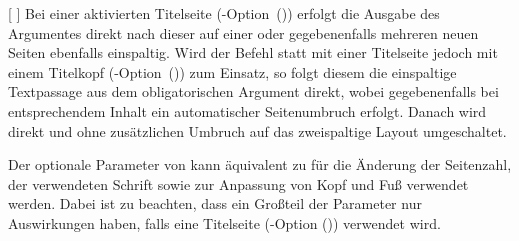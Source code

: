 \begin{Declaration*}{}
\begin{Declaration*}{}
\begin{Declaration*}{}
\begin{Declaration}{%
  [%
  ]%
}
Bei einer aktivierten Titelseite 
(\KOMAScript-Option~()) erfolgt die 
Ausgabe des Argumentes  direkt nach dieser auf einer 
oder gegebenenfalls mehreren neuen Seiten ebenfalls einspaltig. Wird der Befehl 
 statt mit einer Titelseite jedoch mit einem 
Titelkopf (\KOMAScript-Option~()) 
zum Einsatz, so folgt diesem die einspaltige Textpassage aus dem 
obligatorischen Argument direkt, wobei gegebenenfalls bei entsprechendem Inhalt 
ein automatischer Seitenumbruch erfolgt. Danach wird direkt und ohne 
zusätzlichen Umbruch auf das zweispaltige Layout umgeschaltet.

Der optionale Parameter von  kann äquivalent zu 
 für die Änderung der Seitenzahl, der verwendeten Schrift 
sowie zur Anpassung von Kopf und Fuß verwendet werden. Dabei ist zu beachten, 
dass ein Großteil der Parameter nur Auswirkungen haben, falls eine Titelseite
(\KOMAScript-Option ()) verwendet 
wird.
\end{Declaration}


\end{Declaration*}
\end{Declaration*}
\end{Declaration*}
